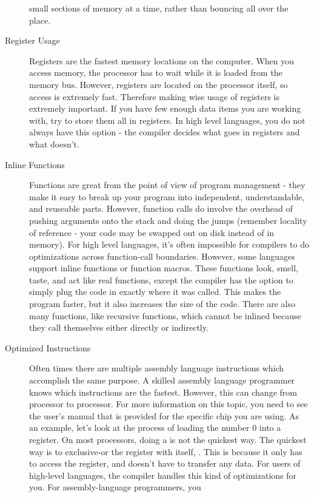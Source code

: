 \begin{description}
small sections of memory at a time, rather than bouncing all over the place.
\item[Register Usage] Registers are the fastest memory locations on the computer.  When you access
memory, the processor has to wait while it is loaded from the 
memory bus.  However, registers are located on the processor itself, 
so access is extremely fast.  Therefore making wise usage of registers 
is extremely important.  If you have few enough data items you are working 
with, try to store them all in registers.  In high level languages,
you do not always have this option - the compiler decides what goes in 
registers and what doesn't.
\item[Inline Functions] Functions are great from the point of view of program management - they 
make it easy to break up your program into independent, understandable, 
and reuseable parts.  However, function calls do involve the overhead of 
pushing arguments onto the stack and doing the jumps (remember locality  of 
reference - your code may be swapped out on disk instead of in memory).  
For high level languages, it's often impossible for compilers to do 
optimizations across function-call 
boundaries.  However, some languages support inline functions or function macros.  These 
functions look, smell, taste, and act like real functions, except the 
compiler has the option to simply plug the code in exactly where it was 
called.  This makes the program faster, but it also increases the size 
of the code.  There are also many functions, like recursive functions, 
which cannot be inlined because they call themselves either directly or 
indirectly.
\item[Optimized Instructions] Often times there are multiple assembly language instructions which 
accomplish the same purpose.   A skilled assembly language programmer 
knows which instructions are the fastest.  However, this can change 
from processor to processor.  For more information on this topic, you need to 
see the user's manual that is provided for the specific chip you are using.  
As an example, let's look at the process of loading the number 0 into a 
register.  On most processors, doing a  is 
not the quickest way.  The quickest way is to exclusive-or the register with 
itself, .  This is because it only has
to access the register, and doesn't have to transfer any data.  
For users of high-level languages, the compiler handles this kind of 
optimizations for you.  For assembly-language programmers, you

\end{description}
